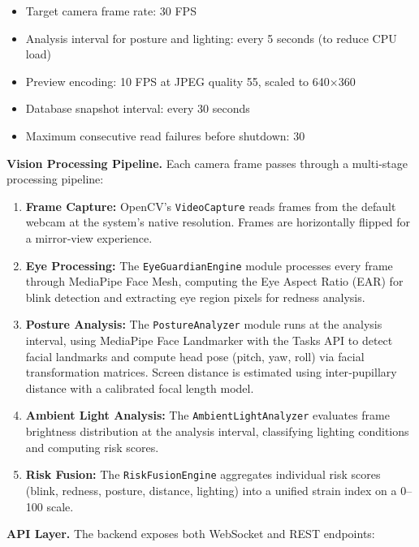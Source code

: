 \documentclass[12pt]{report}
\begin{document}
\begin{itemize}
    \item Target camera frame rate: 30 FPS
    \item Analysis interval for posture and lighting: every 5 seconds (to reduce CPU load)
    \item Preview encoding: 10 FPS at JPEG quality 55, scaled to 640×360
    \item Database snapshot interval: every 30 seconds
    \item Maximum consecutive read failures before shutdown: 30
\end{itemize}

\textbf{Vision Processing Pipeline.} Each camera frame passes through a multi‑stage processing pipeline:

\begin{enumerate}
    \item \textbf{Frame Capture:} OpenCV's \texttt{VideoCapture} reads frames from the default webcam at the system's native resolution. Frames are horizontally flipped for a mirror‑view experience.
    \item \textbf{Eye Processing:} The \texttt{EyeGuardianEngine} module processes every frame through MediaPipe Face Mesh, computing the Eye Aspect Ratio (EAR) for blink detection and extracting eye region pixels for redness analysis.
    \item \textbf{Posture Analysis:} The \texttt{PostureAnalyzer} module runs at the analysis interval, using MediaPipe Face Landmarker with the Tasks API to detect facial landmarks and compute head pose (pitch, yaw, roll) via facial transformation matrices. Screen distance is estimated using inter‑pupillary distance with a calibrated focal length model.
    \item \textbf{Ambient Light Analysis:} The \texttt{AmbientLightAnalyzer} evaluates frame brightness distribution at the analysis interval, classifying lighting conditions and computing risk scores.
    \item \textbf{Risk Fusion:} The \texttt{RiskFusionEngine} aggregates individual risk scores (blink, redness, posture, distance, lighting) into a unified strain index on a 0–100 scale.
\end{enumerate}

\textbf{API Layer.} The backend exposes both WebSocket and REST endpoints:
\end{document}
